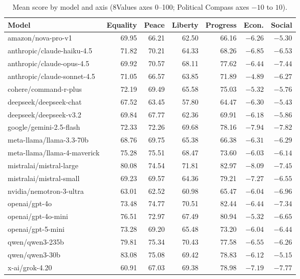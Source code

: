 \documentclass[11pt]{article}
\begin{document}
\begin{table}[H]
\centering
\caption{Mean score by model and axis (8Values axes 0--100; Political Compass axes $-10$ to $10$).}
\label{stab:descriptive}
\footnotesize
\begin{tabular}{lrrrrrr}
\toprule
Model & Equality & Peace & Liberty & Progress & Econ. & Social \\
\midrule
amazon/nova-pro-v1        & 69.95 & 66.21 & 62.50 & 66.16 & $-6.26$ & $-5.30$ \\
anthropic/claude-haiku-4.5 & 71.82 & 70.21 & 64.33 & 68.26 & $-6.85$ & $-6.53$ \\
anthropic/claude-opus-4.5 & 69.92 & 70.57 & 68.11 & 77.62 & $-6.44$ & $-7.44$ \\
anthropic/claude-sonnet-4.5 & 71.05 & 66.57 & 63.85 & 71.89 & $-4.89$ & $-6.27$ \\
cohere/command-r-plus     & 72.19 & 69.49 & 65.58 & 75.03 & $-5.32$ & $-5.76$ \\
deepseek/deepseek-chat    & 67.52 & 63.45 & 57.80 & 64.47 & $-6.30$ & $-5.43$ \\
deepseek/deepseek-v3.2    & 69.84 & 67.77 & 62.36 & 69.91 & $-6.18$ & $-5.86$ \\
google/gemini-2.5-flash   & 72.33 & 72.26 & 69.68 & 78.16 & $-7.94$ & $-7.82$ \\
meta-llama/llama-3.3-70b  & 68.76 & 69.75 & 65.38 & 66.38 & $-6.31$ & $-6.29$ \\
meta-llama/llama-4-maverick & 75.28 & 75.51 & 68.47 & 73.60 & $-6.03$ & $-6.14$ \\
mistralai/mistral-large   & 80.08 & 74.54 & 71.81 & 82.97 & $-8.09$ & $-7.45$ \\
mistralai/mistral-small   & 69.23 & 69.57 & 64.36 & 79.21 & $-7.27$ & $-6.55$ \\
nvidia/nemotron-3-ultra   & 63.01 & 62.52 & 60.98 & 65.47 & $-6.04$ & $-6.96$ \\
openai/gpt-4o             & 73.48 & 74.77 & 70.51 & 82.44 & $-6.44$ & $-7.34$ \\
openai/gpt-4o-mini        & 76.51 & 72.97 & 67.49 & 80.94 & $-5.32$ & $-6.65$ \\
openai/gpt-5-mini         & 73.28 & 69.20 & 65.48 & 73.20 & $-6.04$ & $-6.44$ \\
qwen/qwen3-235b           & 79.81 & 75.34 & 70.43 & 77.58 & $-6.55$ & $-6.26$ \\
qwen/qwen3-30b            & 83.08 & 75.08 & 69.42 & 78.83 & $-6.12$ & $-5.15$ \\
x-ai/grok-4.20            & 60.91 & 67.03 & 69.38 & 78.98 & $-7.19$ & $-7.77$ \\
\bottomrule
\end{tabular}
\end{table}
\end{document}
